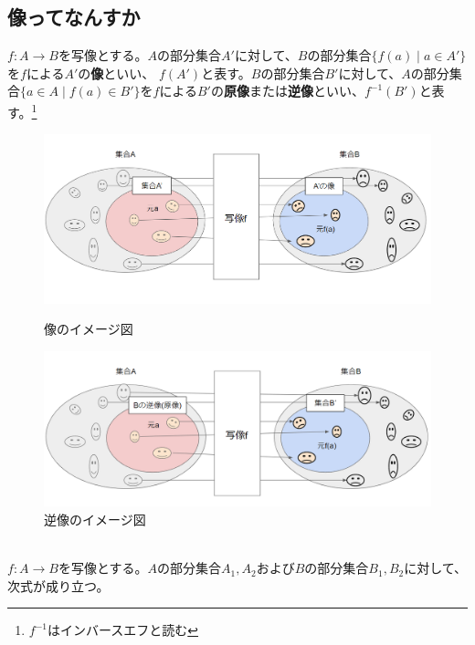 \documentclass[a4j,dvipdfmx]{jsarticle}
\begin{document}
\subsection{像ってなんすか}
$f:A\to B$を写像とする。$A$の部分集合$A'$に対して、$B$の部分集合$\{f(a)\mid a\in A'\}$を$f$による$A'$の\textbf{像}といい、
$f(A')$と表す。$B$の部分集合$B'$に対して、$A$の部分集合$\{a\in A \mid f(a)\in B'\}$を$f$による$B'$の\textbf{原像}または\textbf{逆像}といい、$f^{-1}(B')$と表す。\footnote{$f^{-1}$はインバースエフと読む}

\begin{figure}[h]
    \begin{minipage}{0.5\linewidth}
        \centering
        \includegraphics[keepaspectratio,scale=0.35]{img/写像_像.png}
        \caption{像のイメージ図}
      \end{minipage}
      \begin{minipage}{0.6\linewidth}
        \centering
        \includegraphics[keepaspectratio, scale=0.35]{img/写像_逆増.png}
        \caption{逆像のイメージ図}
      \end{minipage}
\end{figure}
\hrulefill\\
$f:A\to B$を写像とする。$A$の部分集合$A_1,A_2$および$B$の部分集合$B_1,B_2$に対して、次式が成り立つ。
\end{document}
